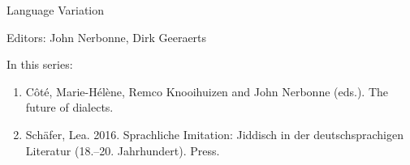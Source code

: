 {\large Language Variation}

\bigskip

Editors: John Nerbonne, Dirk Geeraerts

\bigskip

In this series:

\begin{enumerate}
\item Côté, Marie-Hélène, Remco Knooihuizen and John Nerbonne (eds.). The future of dialects.
\item Schäfer, Lea. 2016. Sprachliche Imitation: Jiddisch in der deutschsprachigen
Literatur (18.–20. Jahrhundert).
Press.
\end{enumerate}



\vfill

